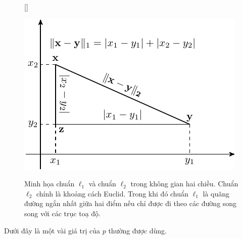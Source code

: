 \begin{figure}[t]
    [\FBwidth]
    {%
    \caption{Minh họa chuẩn $\ell_1$ và chuẩn $\ell_2$ trong không gian hai chiều.
    Chuẩn $\ell_2$ chính
    là khoảng cách Euclid. Trong khi đó chuẩn $\ell_1$ là quãng
    đường ngắn nhất giữa hai điểm nếu chỉ được đi theo các đường song song với
    các trục toạ độ.}
    \label{fig:norm12}}
    { %
    \includegraphics[width=.5\textwidth]{Chapters/02_LinearAlgebra/linearalgebra/norm12.pdf}
    }
\end{figure}
Dưới đây là một vài giá trị của $p$ thường được dùng.
